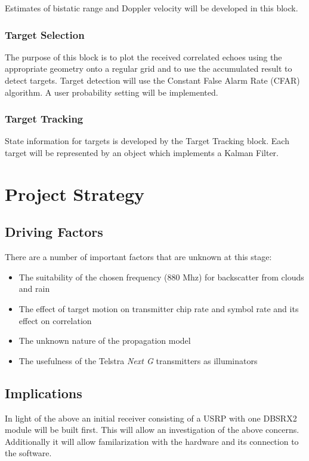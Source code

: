 \documentclass[a4paper]{report}
\numberwithin{equation}{chapter}
\begin{document}
\bigskip

Estimates of bistatic range and Doppler velocity will be developed in this block.

\subsection[Target Selection]{Target Selection}
The purpose of this block is to plot the
received correlated echoes using the appropriate geometry onto a
regular grid and to use the accumulated result to detect targets.
Target detection will use the Constant False Alarm Rate (CFAR)
algorithm. A user probability setting will be implemented.

\bigskip

\subsection[Target Tracking]{Target Tracking}
State information for targets is developed by
the Target Tracking block. Each target will be represented by an object
which implements a Kalman Filter.

\clearpage\setcounter{page}{1}
\chapter[Project Strategy]{Project Strategy}
\section[Driving Factors]{Driving Factors}
There are a number of important factors that are unknown at this stage:
\begin{itemize}
\item{The suitability of the chosen frequency (880 Mhz) for backscatter from clouds and rain}
\item{The effect of target motion on transmitter chip rate and symbol rate and its effect on correlation}
\item{The unknown nature of the propagation model}
\item{The usefulness of the Telstra \textit{Next G} transmitters as illuminators}
\end{itemize}

\section[Implications]{Implications}
In light of the above an initial receiver consisting of a USRP with one DBSRX2 module will be built first. This will allow an investigation of the above concerns. Additionally it will allow familarization with the hardware and its connection to the software.
\end{document}
